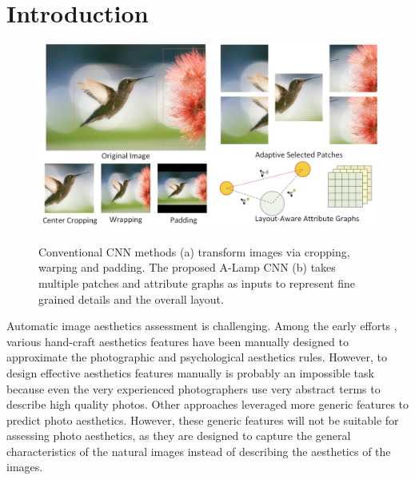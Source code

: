 \documentclass[10pt,twocolumn,letterpaper]{article}
\begin{document}
\section{Introduction} \label{intro}

\begin{figure}
	\centering
	\includegraphics[scale=0.24]{figures/intro}
	\label{transform}
	\caption{Conventional CNN methods (a) transform images via cropping, warping and padding. The proposed A-Lamp CNN (b) takes multiple patches and attribute graphs as inputs to represent fine grained details and the overall layout.}
	\vspace{-5mm}
\end{figure}

Automatic image aesthetics assessment is challenging. Among the early efforts \cite{Datta:2006:ECCV,Ke:2006:CVPR}, various hand-craft aesthetics features \cite{Luo:2008:ECCV,Bhattacharya:2010:ACMMM,Tang:2013:TMM,Sagnik:2011:CVPR,Su:2011:ACMMM,Cohen-Or:2006:SIGGRAPH} have been manually designed to approximate the photographic and psychological aesthetics rules. 
However, to design effective aesthetics features manually is probably an impossible task because even the very experienced photographers use very abstract terms to describe high quality photos.
Other approaches leveraged more generic features\cite{Marchesotti:2011:ICCV,Perronnin:2010:ECCV,Su:2011:ACMMM} to predict photo aesthetics. However, these generic features will not be suitable for assessing photo aesthetics, as they are designed to capture the general characteristics of the natural images instead of describing the aesthetics of the images.
\end{document}

